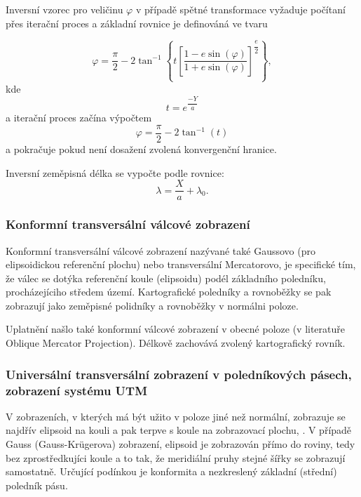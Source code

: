 Inversní vzorec pro veličinu $\varphi$ v případě spětné transformace vyžaduje počítaní přes iterační proces a základní rovnice je definováná ve tvaru \cite{Snyder1987}

\begin{equation}
\varphi = \dfrac{\pi}{2} - 2 \tan^{-1}{\left\lbrace t \left[ \dfrac{1-e\sin{\left(\varphi\right)}}{1+e\sin{\left(\varphi\right)}} \right]^{\dfrac{e}{2}} \right\rbrace}, 
\end{equation}
kde
$$t = e^{\dfrac{-Y}{a}}$$
a iterační proces začína výpočtem
$$\varphi = \dfrac{\pi}{2}-2\tan^{-1}{\left(t\right)}$$
a pokračuje pokud není dosažení zvolená konvergenční hranice.

Inversní zeměpisná délka se vypočte podle rovnice:
\begin{equation}
\lambda = \dfrac{X}{a} + \lambda_{0}.
\end{equation} 

\subsubsection*{Konformní transversální válcové zobrazení}

Konformní transversální válcové zobrazení nazývané také Gaussovo (pro elipsoidickou referenční plochu) nebo transversální Mercatorovo, je specifické tím, že válec  se dotýka referenční koule (elipsoidu) podél základního poledníku, procházejíciho středem území. Kartografické poledníky a rovnoběžky se pak zobrazují jako zeměpisné polidníky a rovnoběžky v normálni poloze. 

Uplatnění našlo také konformní válcové zobrazení v obecné poloze (v literatuře Oblique Mercator Projection). Délkově zachovává zvolený kartografický rovník.

\subsubsection*{Universální transversální zobrazení v poledníkových pásech, zobrazení systému UTM}

V zobrazeních, v kterých má být užito v poloze jiné než normální, zobrazuje se najdřív elipsoid na kouli a pak terpve s koule na zobrazovací plochu, \cite{Buchar2002}. V případě Gauss (Gauss-Kr\"{u}gerova) zobrazení, elipsoid je zobrazován přímo do roviny, tedy bez zprostředkujíci koule a to tak, že meridiální pruhy stejné šířky se zobrazují samostatně. Určující podínkou je konformita a nezkreslený základní (střední) poledník pásu. 

